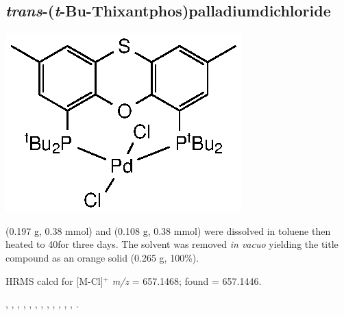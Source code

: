 \subsection*{\emph{trans}-(\emph{t}-Bu-Thixantphos)palladiumdichloride}
\begin{structure}[h]
\begin{center}
\includegraphics{../Structures/StBuPdCl2.eps}
\end{center}
\end{structure}

\tBuThixantphos{} (0.197 g, 0.38 mmol) and \ce{[Pd(COD)Cl2]} (0.108 g, 0.38 mmol) were dissolved in toluene then heated to 40\degC for three days.  The solvent was removed \emph{in vacuo} yielding the title compound as an orange solid (0.265 g, 100\%).


HRMS calcd for  [M-Cl]$^+$ \emph{m/z} = 657.1468; found = 657.1446.


,
,
,
,
,
,
,
,
,
,
,
,
.

